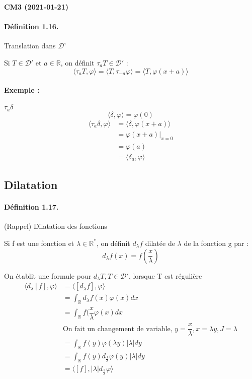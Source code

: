 \documentclass[12pt,a4paper]{report}
\newcommand{\ens}[1]{\mathbb{#1}}
\newcommand{\D}{\ensuremath{\mathcal{D}}}
\begin{document}
\begin{center}
\textbf{CM3 (2021-01-21)}
\end{center}

\paragraph{Définition 1.16.} Translation dans \D'

Si \(T \in \D'\) et \(a \in \ens{R}\), on définit \(\tau_a T \in \D'\) :
\[
	\langle \tau_a T, \varphi \rangle = \langle T, \tau_{-a} \varphi \rangle = \langle T, \varphi(x+a) \rangle
\]

\paragraph{Exemple :} \(\tau_a \delta\)
\[
	\langle \delta, \varphi \rangle = \varphi(0)
\]
\begin{align*}
	\langle \tau_a \delta, \varphi \rangle &= \langle \delta, \varphi(x+a) \rangle\\
	&= \varphi (x+a)\vert_{x = 0}\\
	&= \varphi(a)\\
	&= \langle \delta_a, \varphi \rangle
\end{align*}

\subsection{Dilatation}

\paragraph{Définition 1.17.} (Rappel) Dilatation des fonctions

Si f est une fonction et \(\lambda \in \ens{R^*}\), on définit \(d_\lambda f\) dilatée de \(\lambda\) de la fonction g par :
\[
	d_\lambda f (x) = f(\dfrac{x}{\lambda}) 
\]

On établit une formule pour \(d_\lambda T, T \in \D'\), lorsque T est régulière
\begin{align*}
	\langle d_\lambda [f], \varphi \rangle &= \langle \left[d_\lambda f\right], \varphi \rangle\\
	&= \int_{\ens{R}} d_\lambda f(x) \varphi(x) dx\\
	&= \int_{\ens{R}} f(\dfrac{x}{\lambda} \varphi(x) dx\\
	& \text{On fait un changement de variable, } y= \dfrac{x}{\lambda}, x = \lambda y, J = \lambda\\
	&= \int_{\ens{R}} f(y) \varphi (\lambda y) \vert \lambda \vert dy\\
	&= \int_{\ens{R}} f(y) d_{\frac{1}{\lambda}}\varphi (y) \vert \lambda \vert dy\\
	&= \langle [f], \vert \lambda \vert d_{\frac{1}{\lambda}} \varphi \rangle
\end{align*}
\end{document}
